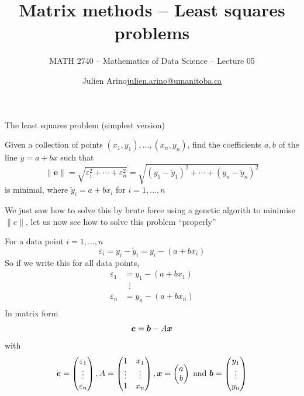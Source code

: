 \documentclass[aspectratio=169]{beamer}\usepackage[]{graphicx}\usepackage[]{xcolor}
\subtitle{MATH 2740 -- Mathematics of Data Science -- Lecture 05}
\author{\texorpdfstring{Julien Arino\newline\url{julien.arino@umanitoba.ca}}{Julien Arino}}
\institute{Department of Mathematics @ University of Manitoba}
\title{Matrix methods -- Least squares problems}
\begin{document}
\setcounter{theorem}{50}




\begin{frame}{The least squares problem (simplest version)}
	\begin{definition}
		Given a collection of points $(x_1,y_1),\ldots,(x_n,y_n)$, find the coefficients $a,b$ of the line $y=a+bx$ such that
		$$
		\|\mathbf{e}\|=\sqrt{\varepsilon_1^2+\cdots+\varepsilon_n^2}
		=\sqrt{(y_1-\tilde y_1)^2+\cdots+(y_n-\tilde y_n)^2}
		$$
		is minimal, where $\tilde y_i=a+bx_i$ for $i=1,\ldots,n$
	\end{definition}
	\vfill
	We just saw how to solve this by brute force using a genetic algorith to minimise $\|e\|$, let us now see how to solve this problem ``properly''
\end{frame}


\begin{frame}
	For a data point $i=1,\ldots,n$
	\[
	\varepsilon_i = y_i-\tilde y_i = y_i - (a+bx_i)
	\]
	So if we write this for all data points,
	\begin{align*}
	\varepsilon_1 &= y_1 - (a+bx_1) \\
	&\;\;\vdots \\
	\varepsilon_n &= y_n - (a+bx_n) \\
	\end{align*}
	In matrix form
	\[
	\bm{e} = \bm{b}-A\bm{x}
	\]
	with
	\[
	\bm{e} = \begin{pmatrix}
	\varepsilon_1\\ \vdots\\ \varepsilon_n
	\end{pmatrix},
	A=\begin{pmatrix}
	1 & x_1 \\ \vdots & \vdots \\ 1 & x_n
	\end{pmatrix},
	\bm{x} = \begin{pmatrix}
	a\\b
	\end{pmatrix}\textrm{ and }
	\bm{b} = \begin{pmatrix}
	y_1\\ \vdots\\ y_n
	\end{pmatrix}
	\]
\end{frame}
\end{document}
